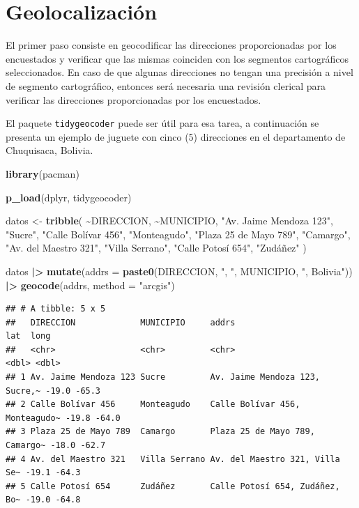 \documentclass[
  12pt,
]{book}
\newenvironment{Shaded}{\begin{snugshade}}{\end{snugshade}}
\newcommand{\AttributeTok}[1]{\textcolor[rgb]{0.13,0.29,0.53}{#1}}
\newcommand{\FunctionTok}[1]{\textcolor[rgb]{0.13,0.29,0.53}{\textbf{#1}}}
\newcommand{\NormalTok}[1]{#1}
\newcommand{\OtherTok}[1]{\textcolor[rgb]{0.56,0.35,0.01}{#1}}
\newcommand{\SpecialCharTok}[1]{\textcolor[rgb]{0.81,0.36,0.00}{\textbf{#1}}}
\newcommand{\StringTok}[1]{\textcolor[rgb]{0.31,0.60,0.02}{#1}}
\begin{document}
\section{Geolocalización}\label{geolocalizaciuxf3n}

El primer paso consiste en geocodificar las direcciones proporcionadas por los encuestados y verificar que las mismas coinciden con los segmentos cartográficos seleccionados. En caso de que algunas direcciones no tengan una precisión a nivel de segmento cartográfico, entonces será necesaria una revisión clerical para verificar las direcciones proporcionadas por los encuestados.

El paquete \texttt{tidygeocoder} \citep{tidygeocoder} puede ser útil para esa tarea, a continuación se presenta un ejemplo de juguete con cinco (5) direcciones en el departamento de Chuquisaca, Bolivia.

\begin{Shaded}
\begin{Highlighting}[]
\FunctionTok{library}\NormalTok{(pacman)}

\FunctionTok{p\_load}\NormalTok{(dplyr, tidygeocoder)}

\NormalTok{datos }\OtherTok{\textless{}{-}} \FunctionTok{tribble}\NormalTok{(}
  \SpecialCharTok{\textasciitilde{}}\NormalTok{DIRECCION, }\SpecialCharTok{\textasciitilde{}}\NormalTok{MUNICIPIO,}
  \StringTok{"Av. Jaime Mendoza 123"}\NormalTok{, }\StringTok{"Sucre"}\NormalTok{,}
  \StringTok{"Calle Bolívar 456"}\NormalTok{, }\StringTok{"Monteagudo"}\NormalTok{,}
  \StringTok{"Plaza 25 de Mayo 789"}\NormalTok{, }\StringTok{"Camargo"}\NormalTok{,}
  \StringTok{"Av. del Maestro 321"}\NormalTok{, }\StringTok{"Villa Serrano"}\NormalTok{,}
  \StringTok{"Calle Potosí 654"}\NormalTok{, }\StringTok{"Zudáñez"}
\NormalTok{)}

\NormalTok{datos }\SpecialCharTok{|\textgreater{}}
  \FunctionTok{mutate}\NormalTok{(}\AttributeTok{addrs =} \FunctionTok{paste0}\NormalTok{(DIRECCION, }\StringTok{", "}\NormalTok{, MUNICIPIO, }\StringTok{", Bolivia"}\NormalTok{)) }\SpecialCharTok{|\textgreater{}}
  \FunctionTok{geocode}\NormalTok{(addrs, }\AttributeTok{method =} \StringTok{"arcgis"}\NormalTok{)}
\end{Highlighting}
\end{Shaded}

\begin{verbatim}
## # A tibble: 5 x 5
##   DIRECCION             MUNICIPIO     addrs                            lat  long
##   <chr>                 <chr>         <chr>                          <dbl> <dbl>
## 1 Av. Jaime Mendoza 123 Sucre         Av. Jaime Mendoza 123, Sucre,~ -19.0 -65.3
## 2 Calle Bolívar 456     Monteagudo    Calle Bolívar 456, Monteagudo~ -19.8 -64.0
## 3 Plaza 25 de Mayo 789  Camargo       Plaza 25 de Mayo 789, Camargo~ -18.0 -62.7
## 4 Av. del Maestro 321   Villa Serrano Av. del Maestro 321, Villa Se~ -19.1 -64.3
## 5 Calle Potosí 654      Zudáñez       Calle Potosí 654, Zudáñez, Bo~ -19.0 -64.8
\end{verbatim}
\end{document}
